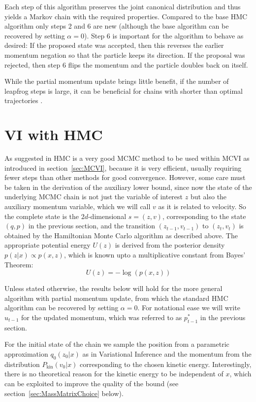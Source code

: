 \documentclass[12pt]{scrartcl}
\begin{document}
Each step of this algorithm preserves the joint canonical distribution and thus yields a Markov chain with the required properties. Compared to the base HMC algorithm only steps 2 and 6 are new (although the base algorithm can be recovered by setting $\alpha = 0$). Step 6 is important for the algorithm to behave as desired: If the proposed state was accepted, then this reverses the earlier momentum negation so that the particle keeps its direction. If the proposal was rejected, then step 6 flips the momentum and the particle doubles back on itself.

While the partial momentum update brings little benefit, if the number of leapfrog steps is large, it can be beneficial for chains with shorter than optimal trajectories \citep{Neal2011}.

\section{VI with HMC}

As suggested in \citep{Salimans2014} HMC is a very good MCMC method to be used within MCVI as introduced in section~\ref{sec:MCVI}, because it is very efficient, usually requiring fewer steps than other methods for good convergence. However, some care must be taken in the derivation of the auxiliary lower bound, since now the state of the underlying MCMC chain is not just the variable of interest $z$ but also the auxiliary momentum variable, which we will call $v$ as it is related to velocity. So the complete state is the $2d$-dimensional $s=(z, v)$, corresponding to the state $(q, p)$ in the previous section, and the transition $(z_{t-1}, v_{t-1})$ to $(z_t, v_t)$ is obtained by the Hamiltonian Monte Carlo algorithm as described above. The appropriate potential energy $U(z)$ is derived from the posterior density $p(z|x) \propto p(x, z)$, which is known upto a multiplicative constant from Bayes' Theorem:
\begin{equation} \label{eq:VIwithHMCPotEnergy}
U(z) = -\log(p(x, z))
\end{equation}

Unless stated otherwise, the results below will hold for the more general algorithm with partial momentum update, from which the standard HMC algorithm can be recovered by setting $\alpha = 0$. For notational ease we will write $u_{t-1}$ for the updated momentum, which was referred to as $p^*_{t-1}$ in the previous section.

\label{sec:KinEnergyMayDependOnX}
For the initial state of the chain we sample the position from a parametric approximation $q_0(z_0|x)$ as in Variational Inference and the momentum from the distribution $P_\textrm{kin}(v_0|x)$ corresponding to the chosen kinetic energy. Interestingly, there is no theoretical reason for the kinetic energy to be independent of $x$, which can be exploited to improve the quality of the bound (see section~\ref{sec:MassMatrixChoice} below).
\end{document}
